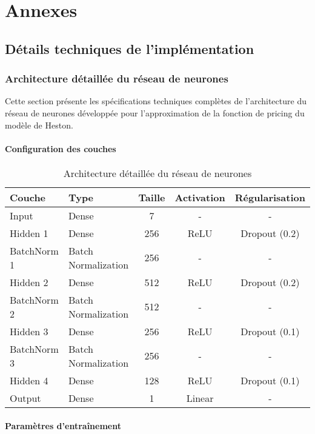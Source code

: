 \chapter{Annexes}

\section{Détails techniques de l'implémentation}

\subsection{Architecture détaillée du réseau de neurones}

Cette section présente les spécifications techniques complètes de l'architecture du réseau de neurones développée pour l'approximation de la fonction de pricing du modèle de Heston.

\subsubsection{Configuration des couches}

\begin{table}[H]
\centering
\caption{Architecture détaillée du réseau de neurones}
\begin{tabular}{@{}llccc@{}}
\toprule
\textbf{Couche} & \textbf{Type} & \textbf{Taille} & \textbf{Activation} & \textbf{Régularisation} \\
\midrule
Input & Dense & 7 & - & - \\
Hidden 1 & Dense & 256 & ReLU & Dropout (0.2) \\
BatchNorm 1 & Batch Normalization & 256 & - & - \\
Hidden 2 & Dense & 512 & ReLU & Dropout (0.2) \\
BatchNorm 2 & Batch Normalization & 512 & - & - \\
Hidden 3 & Dense & 256 & ReLU & Dropout (0.1) \\
BatchNorm 3 & Batch Normalization & 256 & - & - \\
Hidden 4 & Dense & 128 & ReLU & Dropout (0.1) \\
Output & Dense & 1 & Linear & - \\
\bottomrule
\end{tabular}
\end{table}

\subsubsection{Paramètres d'entraînement}

